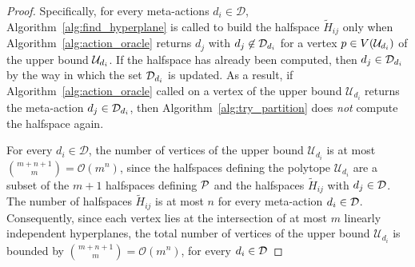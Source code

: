 \begin{proof}
Specifically, for every meta-actions $d_i \in \mathcal{D}$, Algorithm~\ref{alg:find_hyperplane} is called to build the halfspace $\widetilde{H}_{ij}$ only when Algorithm~\ref{alg:action_oracle} returns $d_j$ with $d_j \not \in \mathcal{D}_{d_i}$ for a vertex $p \in V(\mathcal{U}_{d_i})$ of the upper bound $\mathcal{U}_{d_i}$.
%
%
%
If the halfspace has already been computed, then $d_j \in \mathcal{D}_{d_i}$ by the way in which the set $\mathcal{D}_{d_i}$ is updated. As a result, if Algorithm~\ref{alg:action_oracle} called on a vertex of the upper bound $\mathcal{U}_{d_i}$ returns the meta-action $d_j \in \mathcal{D}_{d_i} $, then Algorithm~\ref{alg:try_partition} does \emph{not} compute the halfspace again.
%
%


For every $d_i \in \mathcal{D}$, the number of vertices of the upper bound $\mathcal{U}_{d_i}$ is at most $\binom{m + n + 1}{m} = \mathcal{O}(m^{n })$, since the halfspaces defining the polytope $\mathcal{U}_{d_i}$ are a subset of the $m+1$ halfspaces defining $ \mathcal{P}$ and the halfspaces $\widetilde{H}_{ij}$ with $d_j \in \mathcal{D}$. The number of halfspaces $\widetilde{H}_{ij}$ is at most $n$ for every meta-action $d_i \in \mathcal{D}$.
Consequently, since each vertex lies at the intersection of at most $m$ linearly independent hyperplanes, the total number of vertices of the upper bound $\mathcal{U}_{d_i}$ is bounded by $\binom{ m + n +1}{m} = \mathcal{O}(m^{n})$, for every $d_i \in \mathcal{D}$


\end{proof}
